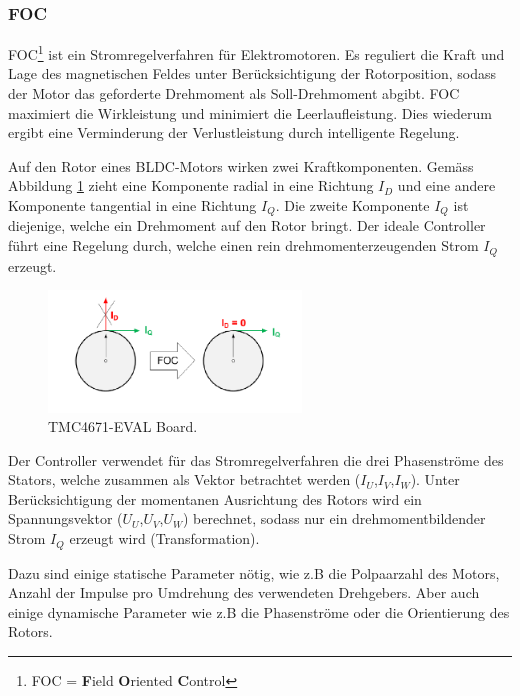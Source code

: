 \subsubsection{FOC}

FOC\footnote{FOC = \textbf{F}ield \textbf{O}riented \textbf{C}ontrol} ist ein Stromregelverfahren für Elektromotoren. Es reguliert die Kraft und Lage des magnetischen Feldes unter Berücksichtigung der Rotorposition, sodass der Motor das geforderte Drehmoment als Soll-Drehmoment abgibt.
FOC maximiert die Wirkleistung und minimiert die Leerlaufleistung. Dies wiederum ergibt eine Verminderung der Verlustleistung durch
intelligente Regelung. \cite{trinamic_datasheet_2018}

Auf den Rotor eines BLDC-Motors wirken zwei Kraftkomponenten. Gemäss Abbildung \ref{fig:TMC4671_EVAL_Board_FOC1} zieht eine Komponente radial in eine Richtung $I_D$ und eine andere Komponente tangential in eine Richtung $I_Q$. Die zweite Komponente $I_Q$ ist diejenige, welche ein Drehmoment auf den Rotor bringt. Der ideale Controller führt eine Regelung durch, welche einen rein drehmomenterzeugenden Strom $I_Q$ erzeugt. \cite{trinamic_datasheet_2018}

\begin{figure}[h!]
	\centering
	\includegraphics[width=0.6\textwidth]{graphics/FOC1.png}
	\caption{TMC4671-EVAL Board. \cite{trinamic_datasheet_2018}}
	\label{fig:TMC4671_EVAL_Board_FOC1}
\end{figure}

Der Controller verwendet für das Stromregelverfahren die drei Phasenströme des Stators, welche zusammen als Vektor betrachtet werden ($I_{U}$,$I_{V}$,$I_{W}$).
Unter Berücksichtigung der momentanen Ausrichtung des Rotors wird ein Spannungsvektor ($U_{U}$,$U_{V}$,$U_{W}$)  berechnet, sodass nur ein drehmomentbildender Strom $I_Q$ erzeugt wird (Transformation). \cite{trinamic_datasheet_2018}

Dazu sind einige statische Parameter nötig, wie z.B die Polpaarzahl des Motors, Anzahl der Impulse pro Umdrehung des verwendeten Drehgebers. Aber auch einige dynamische Parameter wie z.B die Phasenströme oder die Orientierung des Rotors. \cite{trinamic_datasheet_2018}

